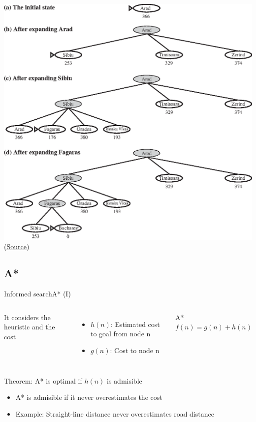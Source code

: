 \documentclass[10pt,compress]{beamer} %
\begin{document}
\begin{frame}
      \begin{center}
          \includegraphics[width=\linewidth]{figs/greedy-progress.eps}\\
          \tiny{\href{http://aima.cs.berkeley.edu/index.html}{(Source)}}
      \end{center}
\end{frame}

\subsection{A*}

\begin{frame}{Informed search}{A* (I)}
    \begin{columns}
            It considers the heuristic and the cost
            \begin{itemize}
                \item $h(n)$: Estimated cost to goal from node n
                \item $g(n)$: Cost to node n
            \end{itemize}

            \begin{block}{A*}
                $f(n) = g(n) + h (n)$
            \end{block}
    \end{columns}

    \bigskip

    Theorem: A* is optimal if $h(n)$ is \alert{admisible}
        \begin{itemize}
        \item A* is admisible if it never overestimates the cost
        \item Example: Straight-line distance never overestimates road distance
        \end{itemize}
    \bigskip
\end{frame}
\end{document}
